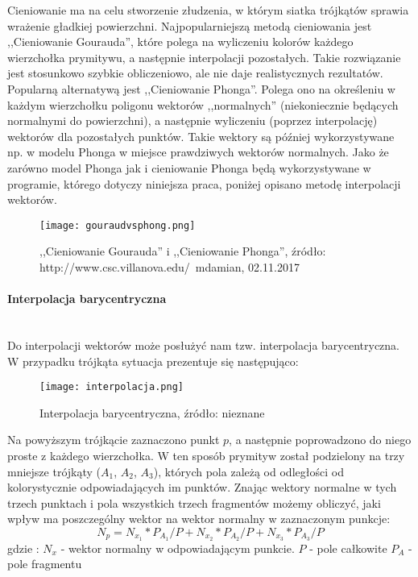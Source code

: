 Cieniowanie ma na celu stworzenie złudzenia, w którym siatka trójkątów sprawia wrażenie gładkiej powierzchni. Najpopularniejszą metodą cieniowania jest ,,Cieniowanie Gourauda'', które polega na wyliczeniu kolorów każdego wierzchołka prymitywu, a następnie interpolacji pozostałych. Takie rozwiązanie jest stosunkowo szybkie obliczeniowo, ale nie daje realistycznych rezultatów. Popularną alternatywą jest ,,Cieniowanie Phonga''. Polega ono na określeniu w każdym wierzchołku poligonu wektorów ,,normalnych'' (niekoniecznie będących normalnymi do powierzchni), a następnie wyliczeniu (poprzez interpolację) wektorów dla pozostałych punktów. Takie wektory są później wykorzystywane np. w modelu Phonga w miejsce prawdziwych wektorów normalnych. Jako że zarówno model Phonga jak i cieniowanie Phonga będą wykorzystywane w programie, którego dotyczy niniejsza praca, poniżej opisano metodę interpolacji wektorów.

\begin{figure}[h!]
\centering
  \caption{,,Cieniowanie Gourauda'' i ,,Cieniowanie Phonga'', źródło: http://www.csc.villanova.edu/~mdamian, 02.11.2017}
  \texttt{[image: gouraudvsphong.png]}
\end{figure}


\paragraph{Interpolacja barycentryczna}\mbox{} \\

Do interpolacji wektorów może posłużyć nam tzw. interpolacja barycentryczna. W przypadku trójkąta sytuacja prezentuje się następująco:

\begin{figure}[h!]
\centering
  \caption{Interpolacja barycentryczna, źródło: nieznane}
  \texttt{[image: interpolacja.png]}
\end{figure}

Na powyższym trójkącie zaznaczono punkt $p$, a następnie poprowadzono do niego proste z każdego wierzchołka. W ten sposób prymityw został podzielony na trzy mniejsze trójkąty ($A_1$, $A_2$, $A_3$), których pola zależą od odległości od kolorystycznie odpowiadających im punktów. Znając wektory normalne w tych trzech punktach i pola wszystkich trzech fragmentów możemy obliczyć, jaki wpływ ma poszczególny wektor na wektor normalny w zaznaczonym punkcje:
$$N_p = N_{x_1} * P_{A_1}/P + N_{x_2} * P_{A_2}/P + N_{x_3} * P_{A_3}/P$$
gdzie :
$N_x$ - wektor normalny w odpowiadającym punkcie.
$P$ - pole całkowite
$P_A$ - pole fragmentu

